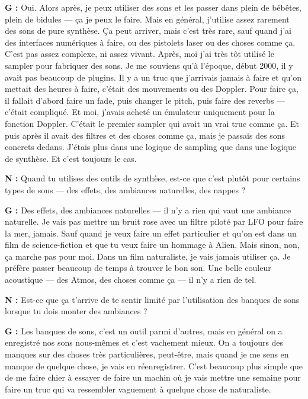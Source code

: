 ﻿\documentclass[12pt]{article}
\begin{document}
\textbf{G :} Oui. Alors après, je peux utiliser des sons et les passer dans plein de bébêtes, plein de bidules — ça je peux le faire. Mais en général, j'utilise assez rarement des sons de pure synthèse. Ça peut arriver, mais c'est très rare, sauf quand j'ai des interfaces numériques à faire, ou des pistolets laser ou des choses comme ça. C'est pas assez complexe, ni assez vivant. Après, moi j'ai très tôt utilisé le sampler pour fabriquer des sons. Je me souviens qu'à l'époque, début 2000, il y avait pas beaucoup de plugins. Il y a un truc que j'arrivais jamais à faire et qu'on mettait des heures à faire, c'était des mouvements ou des Doppler. Pour faire ça, il fallait d'abord faire un fade, puis changer le pitch, puis faire des reverbs — c'était compliqué. Et moi, j'avais acheté un émulateur uniquement pour la fonction Doppler. C'était le premier sampler qui avait un vrai truc comme ça. Et puis après il avait des filtres et des choses comme ça, mais je passais des sons concrets dedans. J'étais plus dans une logique de sampling que dans une logique de synthèse. Et c'est toujours le cas.

\textbf{N :} Quand tu utilises des outils de synthèse, est-ce que c'est plutôt pour certains types de sons — des effets, des ambiances naturelles, des nappes ?

\textbf{G :} Des effets, des ambiances naturelles — il n'y a rien qui vaut une ambiance naturelle. Je vais pas mettre un bruit rose avec un filtre piloté par LFO pour faire la mer, jamais. Sauf quand je veux faire un effet particulier et qu'on est dans un film de science-fiction et que tu veux faire un hommage à Alien. Mais sinon, non, ça marche pas pour moi. Dans un film naturaliste, je vais jamais utiliser ça. Je préfère passer beaucoup de temps à trouver le bon son. Une belle couleur acoustique — des Atmos, des choses comme ça — il n'y a rien de tel.

\textbf{N :} Est-ce que ça t'arrive de te sentir limité par l'utilisation des banques de sons lorsque tu dois monter des ambiances ?

\textbf{G :} Les banques de sons, c'est un outil parmi d'autres, mais en général on a enregistré nos sons nous-mêmes et c'est vachement mieux. On a toujours des manques sur des choses très particulières, peut-être, mais quand je me sens en manque de quelque chose, je vais en réenregistrer. C'est beaucoup plus simple que de me faire chier à essayer de faire un machin où je vais mettre une semaine pour faire un truc qui va ressembler vaguement à quelque chose de naturaliste.
\end{document}
